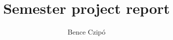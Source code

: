 \documentclass[12pt]{article}
\theoremstyle{definition}
\theoremstyle{plain}
\begin{document}
		
	\title{Semester project report}
	\author{Bence Czipó}
	
	\maketitle
	
	
	
	
	
	
	
	
\end{document}
